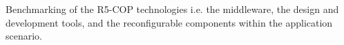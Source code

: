 Benchmarking of the R5-COP technologies i.e. the middleware, the design and development tools, and the reconfigurable components within the application scenario.